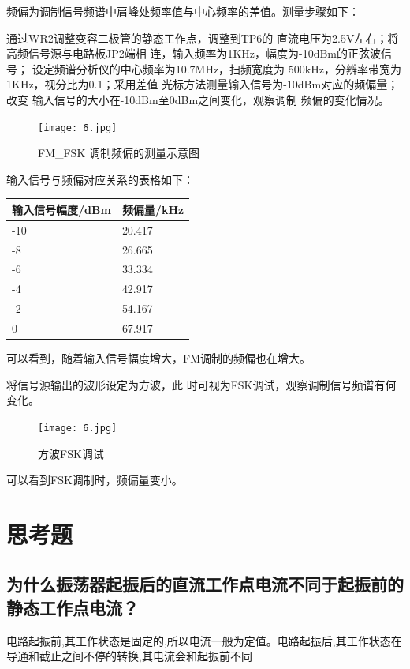 \documentclass{../source/Experiment}
\begin{document}
        频偏为调制信号频谱中肩峰处频率值与中心频率的差值。测量步骤如下：
        
        通过WR2调整变容二极管的静态工作点，调整到TP6的
        直流电压为2.5V左右；将高频信号源与电路板JP2端相
        连，输入频率为1KHz，幅度为-10dBm的正弦波信号；
        设定频谱分析仪的中心频率为10.7MHz，扫频宽度为
        500kHz，分辨率带宽为1KHz，视分比为0.1；采用差值
        光标方法测量输入信号为-10dBm对应的频偏量；改变
        输入信号的大小在-10dBm至0dBm之间变化，观察调制
        频偏的变化情况。
        \begin{figure}[H]
            \centering
            \texttt{[image: 6.jpg]}
            \caption{FM\_FSK 调制频偏的测量示意图}    
        \end{figure}
        
        输入信号与频偏对应关系的表格如下：
        \begin{table}[H]
            \centering
            \begin{tabular}{|l|l|}
            \hline
            输入信号幅度/dBm & 频偏量/kHz \\ \hline
            -10        & 20.417  \\ \hline
            -8         & 26.665  \\ \hline
            -6         & 33.334  \\ \hline
            -4         & 42.917  \\ \hline
            -2         & 54.167  \\ \hline
            0          & 67.917  \\ \hline
            \end{tabular}
            \end{table}
        可以看到，随着输入信号幅度增大，FM调制的频偏也在增大。

        将信号源输出的波形设定为方波，此
        时可视为FSK调试，观察调制信号频谱有何变化。
        \begin{figure}[H]
            \centering
            \texttt{[image: 6.jpg]}
            \caption{方波FSK调试}    
        \end{figure}

        可以看到FSK调制时，频偏量变小。

    \section{思考题}
	    \subsection{为什么振荡器起振后的直流工作点电流不同于起振前的静态工作点电流？}
        电路起振前,其工作状态是固定的,所以电流一般为定值。电路起振后,其工作状态在导通和截止之间不停的转换,其电流会和起振前不同
        
\end{document}
